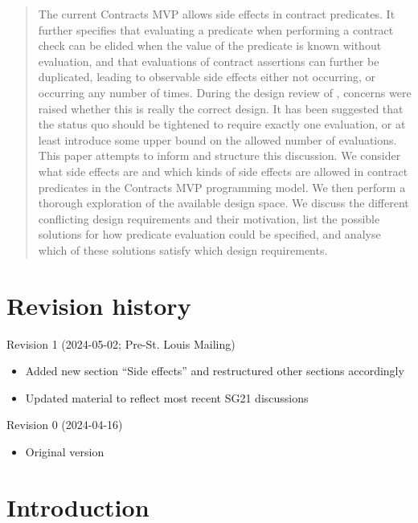\begin{abstract}
The current Contracts MVP \cite{P2900R6} allows side effects in contract predicates. It further specifies that evaluating a predicate when performing a contract check can be elided when the value of the predicate is known without evaluation, and that evaluations of contract assertions can further be duplicated, leading to observable side effects either not occurring, or occurring any number of times. During the design review of \cite{P2900R6}, concerns were raised whether this is really the correct design. It has been suggested that the status quo should be tightened to require exactly one evaluation, or at least introduce some upper bound on the allowed number of evaluations. This paper attempts to inform and structure this discussion. We consider what side effects are and which kinds of side effects are allowed in contract predicates in the Contracts MVP programming model. We then perform a thorough exploration of the available design space. We discuss the different conflicting design requirements and their motivation, list the possible  solutions for how predicate evaluation could be specified, and analyse which of these solutions satisfy which design requirements.
\end{abstract}


\tableofcontents*

\section*{Revision history}

Revision 1 (2024-05-02; Pre-St. Louis Mailing)
\begin{itemize}
\item Added new section ``Side effects'' and restructured other sections accordingly
\item Updated material to reflect most recent SG21 discussions
\end{itemize}

Revision 0 (2024-04-16)
\begin{itemize}
\item Original version
\end{itemize}

\pagebreak


\section{Introduction}
\label{sec:intro}

